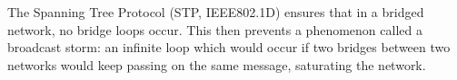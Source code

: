 The Spanning Tree Protocol (STP, IEEE802.1D) ensures that in a bridged network, no bridge loops occur. This then prevents a phenomenon called a broadcast storm: an infinite loop which would occur if two bridges between two networks would keep passing on the same message, saturating the network.